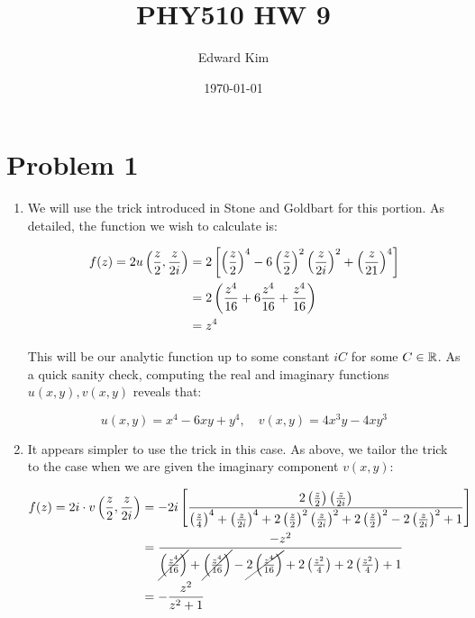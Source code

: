 \documentclass[12pt]{article}%
\title{PHY510 HW 9}
\author{Edward Kim}
\date{\today}
\newcommand{\parafrac}[2]{\para{\frac{#1}{#2}}}
\begin{document}
\maketitle

\section*{Problem 1}

\begin{enumerate}
    \item We will use the trick introduced in Stone and Goldbart for this portion. As detailed, the function we wish to calculate is:

    \begin{align*}
        f(z) = 2u\left(\frac{z}{2},\frac{z}{2i} \right) & = 2\left[\left( {\frac{z}{2}} \right)^4 - 6\left( {\frac{z}{2}} \right)^2\left( {\frac{z}{2i}} \right)^2 + \left( {\frac{z}{21}} \right)^4\right] \\
        & = 2 \left(\frac{z^4}{16} + 6 \frac{z^4}{16} + \frac{z^4}{16}\right) \\
        & = z^4
    \end{align*}

    This will be our analytic function up to some constant $iC$ for some $C \in {\mathbb{R}}$. As a quick sanity check, computing the real and imaginary functions $u(x,y), v(x,y)$ reveals that:

    \[ u(x,y) = x^4  - 6xy + y^4, \quad v(x,y) = 4x^3y - 4xy^3\]

    \item It appears simpler to use the trick in this case. As above, we tailor the trick to the case when we are given the imaginary component $v(x,y)$:

    \def \PartTwoNumerA {2 \parafrac{z}{2} \parafrac{z}{2i}}
    \def \PartTwoDenomA { \parafrac{z}{4}^4 + \parafrac{z}{2i}^4 + 2 \parafrac{z}{2}^2 \parafrac{z}{2i}^2 + 2 \parafrac{z}{2}^2 - 2 \parafrac{z}{2i}^2 + 1 }

    \def \PartTwoDenomB {\cancel{\parafrac{z^4}{16}} + \cancel{\parafrac{z^4}{16}} - \cancel{2 \parafrac{z^4}{16}} + 2\parafrac{z^2}{4} + 2\parafrac{z^2}{4} + 1}

    \begin{align*}
      f(z) = 2i \cdot v\left(\frac{z}{2}, \frac{z}{2i} \right) & = -2i \left[\frac{\PartTwoNumerA}{\PartTwoDenomA} \right]\\
      & = \frac{-z^2}{\PartTwoDenomB} \\
      & = - \frac{z^2}{z^2 + 1}
    \end{align*}


\end{enumerate}
\end{document}
